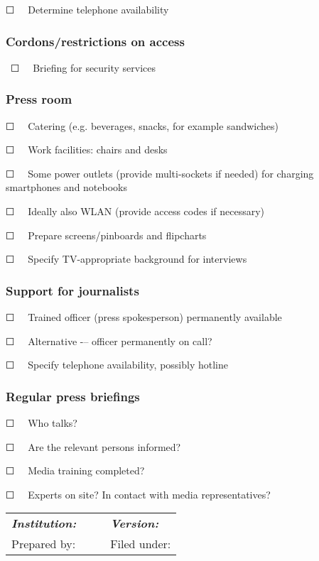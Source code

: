 \documentclass{article}
\begin{document}
☐   Determine telephone availability  


\subsubsection{Cordons/restrictions on access}\label{H5004432}



 ☐   Briefing for security services


\subsubsection{Press room}\label{H3108982}



☐   Catering (e.g. beverages, snacks, for example sandwiches)


☐   Work facilities: chairs and desks


☐   Some power outlets (provide multi-sockets if needed) for charging smartphones and notebooks


☐   Ideally also WLAN (provide access codes if necessary)


☐   Prepare screens/pinboards and flipcharts


☐   Specify TV-appropriate background for interviews


\subsubsection{Support for journalists}\label{H6595140}



☐   Trained officer (press spokesperson) permanently available


☐   Alternative -– officer permanently on call?


☐   Specify telephone availability, possibly hotline


\subsubsection{Regular press briefings}\label{H8837330}



☐   Who talks? 


☐   Are the relevant persons informed? 


☐   Media training completed?


☐   Experts on site? In contact with media representatives?


\begin{tabu} to \textwidth { |X|X|X| }
\hline



\emph{\textbf{Institution:}}   &  & \emph{\textbf{Version:}}
 \\


Prepared by:  &  & Filed under:
 \\
\hline

\end{tabu}

 
\end{document}
